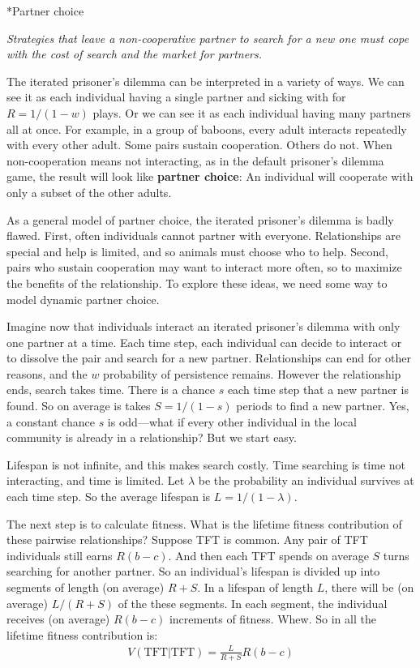 \documentclass[10pt,reqno]{amsbook}
\makeatletter
\newcommand{\bemph}[1]{{\textbf{\textcolor{bemphcol}{#1}}}}
\renewcommand\section{\@startsection{section}{1}
\z@{.7\linespacing\@plus\linespacing}{.5\linespacing}
{\large\bfseries\itshape}}
\numberwithin{equation}{chapter}
\newenvironment{precis}
{\noi\itshape}
{\vspace{6pt}}
\newcommand{\noi}{\noindent}
\makeatother
\begin{document}
\section*{Partner choice}

\begin{precis}Strategies that leave a non-cooperative partner to search for a new one must cope with the cost of search and the market for partners.\end{precis}

The iterated prisoner's dilemma can be interpreted in a variety of ways. We can see it as each individual having a single partner and sicking with for $R=1/(1-w)$ plays. Or we can see it as each individual having many partners all at once. For example, in a group of baboons, every adult interacts repeatedly with every other adult. Some pairs sustain cooperation. Others do not. When non-cooperation means not interacting, as in the default prisoner's dilemma game, the result will look like \bemph{partner choice}: An individual will cooperate with only a subset of the other adults.

As a general model of {partner choice}, the iterated prisoner's dilemma is badly flawed. First, often individuals cannot partner with everyone. Relationships are special and help is limited, and so animals must choose who to help. Second, pairs who sustain cooperation may want to interact more often, so to maximize the benefits of the relationship. To explore these ideas, we need some way to model dynamic partner choice.

Imagine now that individuals interact an iterated prisoner's dilemma with only one partner at a time. Each time step, each individual can decide to interact or to dissolve the pair and search for a new partner. Relationships can end for other reasons, and the $w$ probability of persistence remains. However the relationship ends, search takes time. There is a chance $s$ each time step that a new partner is found. So on average is takes $S=1/(1-s)$ periods to find a new partner. Yes, a constant chance $s$ is odd---what if every other individual in the local community is already in a relationship? But we start easy.

Lifespan is not infinite, and this makes search costly. Time searching is time not interacting, and time is limited. Let $\lambda$ be the probability an individual survives at each time step. So the average lifespan is $L=1/(1-\lambda)$.

The next step is to calculate fitness. What is the lifetime fitness contribution of these pairwise relationships? Suppose TFT is common. Any pair of TFT individuals still earns $R(b-c)$. And then each TFT spends on average $S$ turns searching for another partner. So an individual's lifespan is divided up into segments of length (on average) $R+S$. In a lifespan of length $L$, there will be (on average) $L/(R+S)$ of the these segments. In each segment, the individual receives (on average) $R(b-c)$ increments of fitness. Whew. So in all the lifetime fitness contribution is:
\begin{align*}
	V(\text{TFT}|\text{TFT}) = \frac{L}{R+S}R(b-c)
\end{align*}
\end{document}
